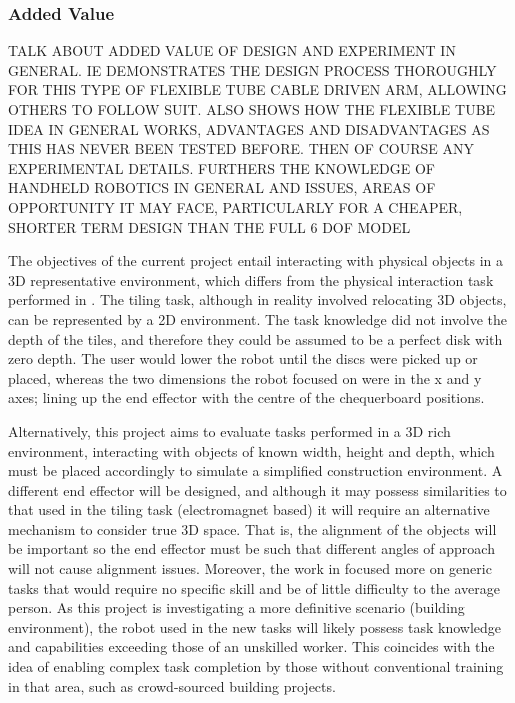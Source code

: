\documentclass[11pt]{article}
\begin{document}
\subsubsection{Added Value}

TALK ABOUT ADDED VALUE OF DESIGN AND EXPERIMENT IN GENERAL. IE DEMONSTRATES THE DESIGN PROCESS THOROUGHLY FOR THIS TYPE OF FLEXIBLE TUBE CABLE DRIVEN ARM, ALLOWING OTHERS TO FOLLOW SUIT. ALSO SHOWS HOW THE FLEXIBLE TUBE IDEA IN GENERAL WORKS, ADVANTAGES AND DISADVANTAGES AS THIS HAS NEVER BEEN TESTED BEFORE. THEN OF COURSE ANY EXPERIMENTAL DETAILS. FURTHERS THE KNOWLEDGE OF HANDHELD ROBOTICS IN GENERAL AND ISSUES, AREAS OF OPPORTUNITY IT MAY FACE, PARTICULARLY FOR A CHEAPER, SHORTER TERM DESIGN THAN THE FULL 6 DOF MODEL

The objectives of the current project entail interacting with physical objects in a 3D representative environment, which differs from the physical interaction task performed in \cite{GreggSmithDesign}. The tiling task, although in reality involved relocating 3D objects, can be represented by a 2D environment. The task knowledge did not involve the depth of the tiles, and therefore they could be assumed to be a perfect disk with zero depth. The user would lower the robot until the discs were picked up or placed, whereas the two dimensions the robot focused on were in the x and y axes; lining up the end effector with the centre of the chequerboard positions.

Alternatively, this project aims to evaluate tasks performed in a 3D rich environment, interacting with objects of known width, height and depth, which must be placed accordingly to simulate a simplified construction environment. A different end effector will be designed, and although it may possess similarities to that used in the tiling task (electromagnet based) it will require an alternative mechanism to consider true 3D space. That is, the alignment of the objects will be important so the end effector must be such that different angles of approach will not cause alignment issues. Moreover, the work in \cite{GreggSmithDesign} focused more on generic tasks that would require no specific skill and be of little difficulty to the average person. As this project is investigating a more definitive scenario (building environment), the robot used in the new tasks will likely possess task knowledge and capabilities exceeding those of an unskilled worker. This coincides with the idea of enabling complex task completion by those without conventional training in that area, such as crowd-sourced building projects.
\end{document}
